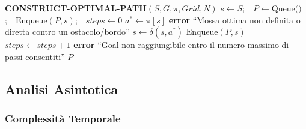 \begin{algorithm}[H]
\caption{Costruzione di una soluzione ottima}
\label{alg:path}
\begin{algorithmic}[1]
\Statex \textbf{CONSTRUCT-OPTIMAL-PATH}$(S, G, \pi, Grid, N)$
\State $s \gets S$;\ \ $P \gets \text{Queue()}$;\ \ $\text{Enqueue}(P, s)$;\ \ $steps \gets 0$ \label{cop:init}
 \label{cop:while}
    \State \Do $a^* \gets \pi[s]$
        \State \Then \textbf{error} ``Mossa ottima non definita o diretta contro un ostacolo/bordo''
    \EndIf
    \State $s \gets \delta(s, a^*)$
    \State $\text{Enqueue}(P, s)$ 
    \State $steps \gets steps + 1$ \label{cop:while-end}
\EndWhile
{}
    \State \Then \textbf{error} ``Goal non raggiungibile entro il numero massimo di passi consentiti''
\EndIf
\State \Return $P$
\end{algorithmic}
\end{algorithm}

\clearpage
\subsection{Analisi Asintotica}
\subsubsection{Complessità Temporale}

